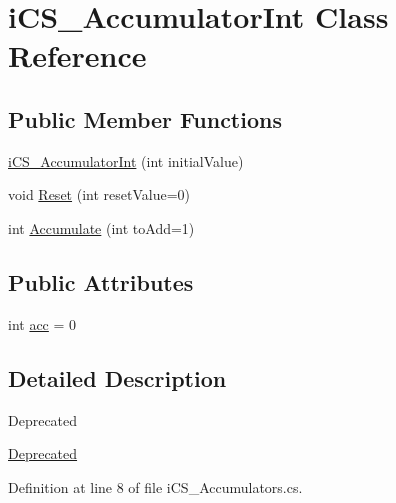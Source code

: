\hypertarget{classi_c_s___accumulator_int}{\section{i\+C\+S\+\_\+\+Accumulator\+Int Class Reference}
\label{classi_c_s___accumulator_int}
}
\subsection*{Public Member Functions}
\begin{DoxyCompactItemize}
\item 
\hyperlink{classi_c_s___accumulator_int_a0ae09ad524ed9ed2bec9f85a9c1283a8}{i\+C\+S\+\_\+\+Accumulator\+Int} (int initial\+Value)
\item 
void \hyperlink{classi_c_s___accumulator_int_a2ba7547ca917ee73c137546c2fa17893}{Reset} (int reset\+Value=0)
\item 
int \hyperlink{classi_c_s___accumulator_int_a160c26b534c6058dd06f1681e8cd48e7}{Accumulate} (int to\+Add=1)
\end{DoxyCompactItemize}
\subsection*{Public Attributes}
\begin{DoxyCompactItemize}
\item 
int \hyperlink{classi_c_s___accumulator_int_a6eafc15fa6d361a8535bff2d3aaf0cad}{acc} = 0
\end{DoxyCompactItemize}


\subsection{Detailed Description}
\begin{DoxyRefDesc}{Deprecated}
\item[\hyperlink{deprecated__deprecated000001}{Deprecated}]\end{DoxyRefDesc}


Definition at line 8 of file i\+C\+S\+\_\+\+Accumulators.\+cs.




